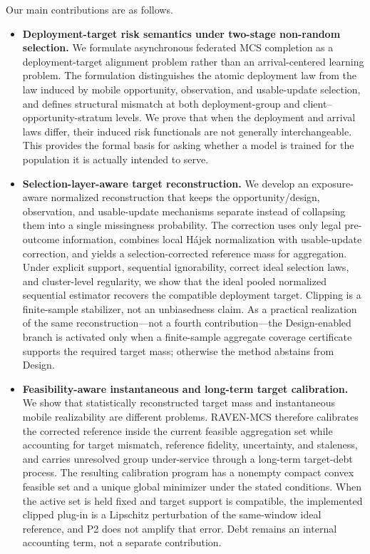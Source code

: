 \documentclass[letterpaper,journal]{IEEEtran}
\begin{document}
Our main contributions are as follows.

\begin{itemize}
    \item \textbf{Deployment-target risk semantics under two-stage non-random
    selection.}
    We formulate asynchronous federated MCS completion as a
    deployment-target alignment problem rather than an arrival-centered
    learning problem.  The formulation distinguishes the atomic deployment law
    from the law induced by mobile opportunity, observation, and usable-update
    selection, and defines structural mismatch at both deployment-group and
    client--opportunity-stratum levels.  We prove that when the deployment and
    arrival laws differ, their induced risk functionals are not generally
    interchangeable.  This provides the formal basis for asking whether a model
    is trained for the population it is actually intended to serve.

    \item \textbf{Selection-layer-aware target reconstruction.}
    We develop an exposure-aware normalized reconstruction that keeps the
    opportunity/design, observation, and usable-update mechanisms separate
    instead of collapsing them into a single missingness probability.  The
    correction uses only legal pre-outcome information, combines local
    H\'ajek normalization with usable-update correction, and yields a
    selection-corrected reference mass for aggregation.  Under explicit support,
    sequential ignorability, correct ideal selection laws, and cluster-level
    regularity, we show that the ideal pooled normalized sequential estimator
    recovers the compatible deployment target.  Clipping is a finite-sample
    stabilizer, not an unbiasedness claim.  As a practical realization of the
    same reconstruction---not a fourth contribution---the Design-enabled
    branch is activated only when a finite-sample aggregate coverage
    certificate supports the required target mass; otherwise the method
    abstains from Design.

    \item \textbf{Feasibility-aware instantaneous and long-term target
    calibration.}
    We show that statistically reconstructed target mass and instantaneous
    mobile realizability are different problems.  RAVEN-MCS therefore
    calibrates the corrected reference inside the current feasible aggregation
    set while accounting for target mismatch, reference fidelity, uncertainty,
    and staleness, and carries unresolved group under-service through a
    long-term target-debt process.  The resulting calibration program has a
    nonempty compact convex feasible set and a unique global minimizer under the
    stated conditions.  When the active set is held fixed and target support is
    compatible, the implemented clipped plug-in is a Lipschitz perturbation of
    the same-window ideal reference, and P2 does not amplify that error.
    Debt remains an internal accounting term, not a separate contribution.
\end{itemize}
\end{document}
